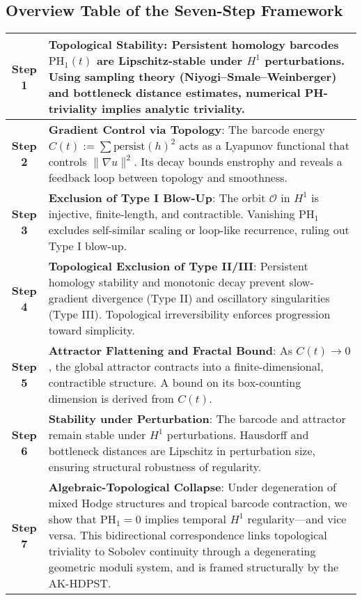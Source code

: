 \documentclass[11pt]{article}
\theoremstyle{definition}
\begin{document}
\subsection*{Overview Table of the Seven-Step Framework}

\begin{center}
\renewcommand{\arraystretch}{1.4}
\begin{tabular}{|c|p{12.5cm}|}
\hline
\textbf{Step 1} & \textbf{Topological Stability}: Persistent homology barcodes $\mathrm{PH}_1(t)$ are Lipschitz-stable under $H^1$ perturbations. Using sampling theory (Niyogi--Smale--Weinberger) and bottleneck distance estimates, numerical PH-triviality implies analytic triviality. \\
\hline
\textbf{Step 2} & \textbf{Gradient Control via Topology}: The barcode energy $C(t) := \sum \mathrm{persist}(h)^2$ acts as a Lyapunov functional that controls $\|\nabla u\|^2$. Its decay bounds enstrophy and reveals a feedback loop between topology and smoothness. \\
\hline
\textbf{Step 3} & \textbf{Exclusion of Type I Blow-Up}: The orbit $\mathcal{O}$ in $H^1$ is injective, finite-length, and contractible. Vanishing $\mathrm{PH}_1$ excludes self-similar scaling or loop-like recurrence, ruling out Type I blow-up. \\
\hline
\textbf{Step 4} & \textbf{Topological Exclusion of Type II/III}: Persistent homology stability and monotonic decay prevent slow-gradient divergence (Type II) and oscillatory singularities (Type III). Topological irreversibility enforces progression toward simplicity. \\
\hline
\textbf{Step 5} & \textbf{Attractor Flattening and Fractal Bound}: As $C(t) \to 0$, the global attractor contracts into a finite-dimensional, contractible structure. A bound on its box-counting dimension is derived from $C(t)$. \\
\hline
\textbf{Step 6} & \textbf{Stability under Perturbation}: The barcode and attractor remain stable under $H^1$ perturbations. Hausdorff and bottleneck distances are Lipschitz in perturbation size, ensuring structural robustness of regularity. \\
\hline
\textbf{Step 7} & \textbf{Algebraic-Topological Collapse}: Under degeneration of mixed Hodge structures and tropical barcode contraction, we show that $\mathrm{PH}_1 = 0$ implies temporal $H^1$ regularity---and vice versa. This bidirectional correspondence links topological triviality to Sobolev continuity through a degenerating geometric moduli system, and is framed structurally by the AK-HDPST.
\\
\hline
\end{tabular}
\end{center}
\end{document}
